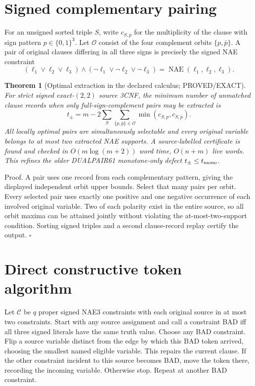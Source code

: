 \documentclass[11pt]{article}
\newtheorem{theorem}{Theorem}
\begin{document}
\section{Signed complementary pairing}
For an unsigned sorted triple $S$, write $c_{S,p}$ for the multiplicity of the clause with sign pattern $p\in\{0,1\}^3$. Let $\mathcal O$ consist of the four complement orbits $\{p,\bar p\}$. A pair of original clauses differing in all three signs is precisely the signed NAE constraint
\[
(\ell_1\vee\ell_2\vee\ell_3)\wedge
(\neg\ell_1\vee\neg\ell_2\vee\neg\ell_3)
=\operatorname{NAE}(\ell_1,\ell_2,\ell_3).
\]
\begin{theorem}[Optimal extraction in the declared calculus; PROVED/EXACT]
For strict signed exact-$(2,2)$ source 3CNF, the minimum number of unmatched clause records when only full-sign-complement pairs may be extracted is
\[
t_{\pm}=m-2\sum_S\sum_{\{p,\bar p\}\in\mathcal O}
\min(c_{S,p},c_{S,\bar p}).
\]
All locally optimal pairs are simultaneously selectable and every original variable belongs to at most two extracted NAE supports. A source-labelled certificate is found and checked in $O(m\log(m+2))$ word time, $O(n+m)$ live words. This refines the older DUALPAIR61 monotone-only defect $t_{\pm}\le t_{\rm mono}$.
\end{theorem}
\noindent Proof. A pair uses one record from each complementary pattern, giving the displayed independent orbit upper bounds. Select that many pairs per orbit. Every selected pair uses exactly one positive and one negative occurrence of each involved original variable. Two of each polarity exist in the entire source, so all orbit maxima can be attained jointly without violating the at-most-two-support condition. Sorting signed triples and a second clause-record replay certify the output. \hfill$\square$

\section{Direct constructive token algorithm}
Let $\mathcal C$ be $q$ proper signed NAE3 constraints with each original source in at most two constraints. Start with any source assignment and call a constraint BAD iff all three signed literals have the same truth value. Choose any BAD constraint. Flip a source variable distinct from the edge by which this BAD token arrived, choosing the smallest named eligible variable. This repairs the current clause. If the other constraint incident to this source becomes BAD, move the token there, recording the incoming variable. Otherwise stop. Repeat at another BAD constraint.
\end{document}
